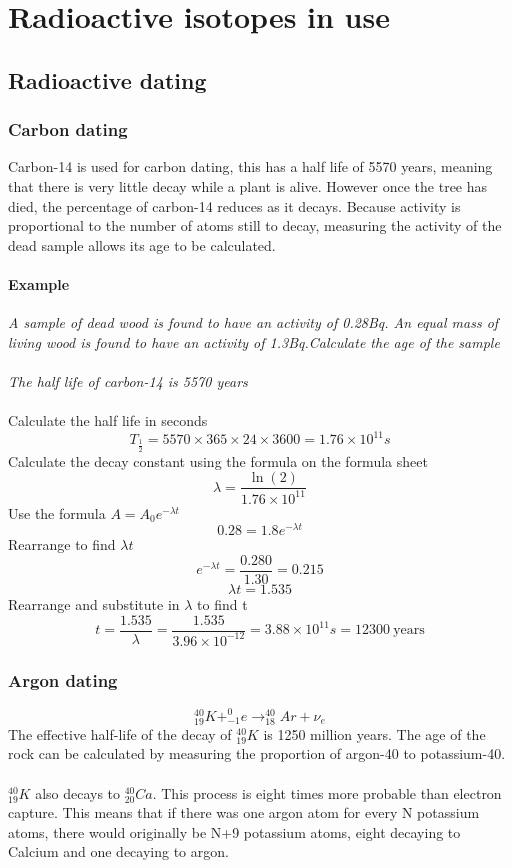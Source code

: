 \documentclass{article}[18pt]
\begin{document}
\section{Radioactive isotopes in use}
\subsection{Radioactive dating}
\subsubsection{Carbon dating}
Carbon-14 is used for carbon dating, this has a half life of 5570 years, meaning that there is very little decay while a plant is alive. However once the tree has died, the percentage of carbon-14 reduces as it decays. Because activity is proportional to the number of atoms still to decay, measuring the activity of the dead sample allows its age to be calculated.
\paragraph{Example}
\textit{A sample of dead wood is found to have an activity of 0.28Bq. An equal mass of living wood is found to have an activity of 1.3Bq.Calculate the age of the sample\\
\\
The half life of carbon-14 is 5570 years }\\
\\
Calculate the half life in seconds
$$T_{\frac{1}{2}}=5570\times365\times24\times3600=1.76\times10^{11}s$$
Calculate the decay constant using the formula on the formula sheet
$$\lambda=\frac{\ln(2)}{1.76\times10^{11}}$$
Use the formula $A=A_0e^{-\lambda t}$
$$0.28=1.8e^{-\lambda t}$$
Rearrange to find $\lambda t$
$$e^{-\lambda t}=\frac{0.280}{1.30}=0.215$$
$$\lambda t=1.535$$
Rearrange and substitute in $\lambda$ to find t
$$t=\frac{1.535}{\lambda}=\frac{1.535}{3.96\times10^{-12}}=3.88\times10^{11}s=12300 \ \textrm{years}$$
\subsubsection{Argon dating}
$$^{40}_{19}K+^0_{-1}e\rightarrow^{40}_{18}Ar+\nu_e$$
The effective half-life of the decay of $^{40}_{19}K$ is 1250 million years. The age of the rock can be calculated by measuring the proportion of argon-40 to potassium-40.\\
\\
$^{40}_{19}K$ also decays to $^{40}_{20}Ca$. This process is eight times more probable than electron capture. This means that if there was one argon atom for every N potassium atoms, there would originally be N+9 potassium atoms, eight decaying to Calcium and one decaying to argon.
\end{document}
